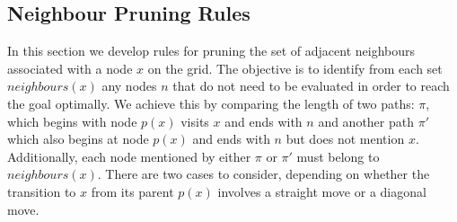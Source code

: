 \subsection{Neighbour Pruning Rules} 
\label{sec:pruning}

In this section we develop rules for pruning the set of adjacent neighbours
associated with a node $x$ on the grid.  The objective is to identify from each
set $neighbours(x)$ any nodes $n$ that do not need to be evaluated in order to
reach the goal optimally. We achieve this by comparing the length of two paths:
$\pi$, which begins with node $p(x)$ visits $x$ and ends with $n$ and another
path $\pi'$ which also begins at node $p(x)$ and ends with $n$ but does not 
mention $x$. 
Additionally, each node mentioned by either $\pi$ or $\pi'$ must belong to 
$neighbours(x)$.
There are two cases to consider, depending on
whether the transition to $x$ from its parent $p(x)$ involves a straight move or
a diagonal move. 

